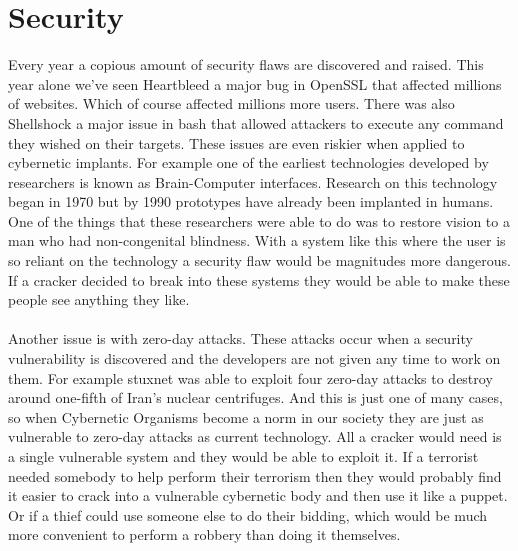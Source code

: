 \documentclass[12pt,a4paper,notitlepage]{article}
\begin{document}
\section{Security}
Every year a copious amount of security flaws are discovered and raised. This
year alone we've seen Heartbleed\cite{Heartbleed} a major bug in OpenSSL that
affected millions of websites. Which of course affected millions more users.
There was also Shellshock\cite{Shellshock} a major issue in bash that allowed
attackers to execute any command they wished on their targets. These issues are
even riskier when applied to cybernetic implants. For example one of the
earliest technologies developed by researchers is known as Brain-Computer
interfaces. Research on this technology began in 1970 but by 1990 prototypes
have already been implanted in humans. One of the things that these researchers
were able to do was to restore vision to a man who had non-congenital
blindness\cite{sight}. With a system like this where the user is so reliant on
the technology a security flaw would be magnitudes more dangerous. If a cracker
decided to break into these systems they would be able to make these people see
anything they like.
\\\\
Another issue is with zero-day attacks. These attacks occur when a security
vulnerability is discovered and the developers are not given any time to work on
them. For example stuxnet\cite{0day} was able to exploit four zero-day attacks
to destroy around one-fifth of Iran's nuclear centrifuges. And this is just one
of many cases, so when Cybernetic Organisms become a norm in our society they
are just as vulnerable to zero-day attacks as current technology. All a cracker
would need is a single vulnerable system and they would be able to exploit it.
If a terrorist needed somebody to help perform their terrorism then they would
probably find it easier to crack into a vulnerable cybernetic body and then use
it like a puppet. Or if a thief could use someone else to do their bidding,
which would be much more convenient to perform a robbery than doing it
themselves.
\\
\end{document}
